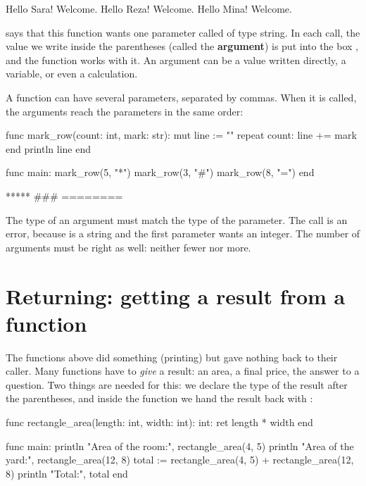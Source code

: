 \begin{salamout}
Hello Sara! Welcome.
Hello Reza! Welcome.
Hello Mina! Welcome.
\end{salamout}

 says that this function wants one parameter called
 of type string. In each call, the value we write inside the
parentheses (called the \textbf{argument}) is put into the box ,
and the function works with it. An argument can be a value written directly,
a variable, or even a calculation.

A function can have several parameters, separated by commas. When it is
called, the arguments reach the parameters in the same order:

\begin{salamcode}
func mark_row(count: int, mark: str):
    mut line := ""
    repeat count:
        line += mark
    end
    println line
end

func main:
    mark_row(5, "*")
    mark_row(3, "#")
    mark_row(8, "=")
end
\end{salamcode}

\begin{salamout}
*****
###
========
\end{salamout}

\begin{warn}
The type of an argument must match the type of the parameter. The call
 is an error, because  is a string and
the first parameter wants an integer. The number of arguments must be right
as well: neither fewer nor more.
\end{warn}

\section{Returning: getting a result from a function}

The functions above did something (printing) but gave nothing back to their
caller. Many functions have to \emph{give} a result: an area, a final price,
the answer to a question. Two things are needed for this: we declare the
type of the result after the parentheses, and inside the function we hand
the result back with :

\begin{salamcode}
func rectangle_area(length: int, width: int): int:
    ret length * width
end

func main:
    println "Area of the room:", rectangle_area(4, 5)
    println "Area of the yard:", rectangle_area(12, 8)
    total := rectangle_area(4, 5) + rectangle_area(12, 8)
    println "Total:", total
end
\end{salamcode}

